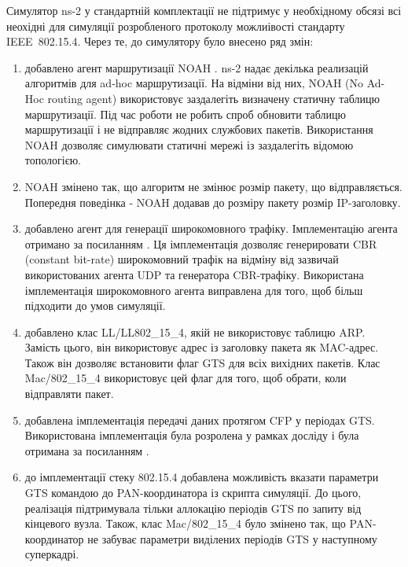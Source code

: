 \documentclass[a4paper,ukrainian,utf8,nocolumnsxix,floatsection,equationsection]{eskdtext}
\newcommand{\iee}[0]{IEEE~802.15.4\xspace}
\begin{document}
Симулятор ns-2 у стандартній комплектації не підтримує у необхідному обсязі всі неохідні для симуляції розробленого протоколу можлиівості стандарту \iee. Через те, до симулятору було внесено ряд змін:

\begin{enumerate}
	\item добавлено агент маршрутизації NOAH \cite{ns2:noah}. ns-2 надає декілька реализацій алгоритмів для ad-hoc маршрутизації. На відміни від них, NOAH (No Ad-Hoc routing agent) використовує заздалегіть визначену статичну таблицю маршрутизації. Під час роботи не робить спроб обновити таблицю маршрутизації і не відправляє жодних службових пакетів. Використання NOAH дозволяє симулювати статичні мережі із заздалегіть відомою топологією.

	\item NOAH змінено так, що алгоритм не змінює розмір пакету, що відправляється. Попередня поведінка - NOAH додавав до розміру пакету розмір IP-заголовку. 

	\item добавлено агент для генерації широкомовного трафіку. Імплементацію агента отримано за посиланням \cite{ns2:broadcastapp}. Ця імплементація дозволяє генерировати CBR (constant bit-rate) широкомовний трафік на відміну від зазвичай використованих агента UDP та генератора CBR-трафіку. Використана імплементація широкомовного агента виправлена для того, щоб більш підходити до умов симуляції.
	

	\item добавлено клас LL/LL802\_15\_4, якій не використовує таблицю ARP. Замість цього, він використовує адрес із заголовку пакета як MAC-адрес. Також він дозволяє встановити флаг GTS для всіх вихідних пакетів. Клас Mac/802\_15\_4 використовує цей флаг для того, щоб обрати, коли відправляти пакет. 

	\item добавлена імплементація передачі даних протягом CFP у періодах GTS. Використована імплементація була розролена у рамках досліду \cite{ns2:with:cfp} і була отримана за посиланням \cite{ns2:with:cfp:sources}.

	\item до імплементації стеку 802.15.4 добавлена можливість вказати параметри GTS командою до PAN-координатора із скрипта симуляції. До цього, реалізація підтримувала тільки аллокацію періодів GTS по запиту від кінцевого вузла. Також, клас Mac/802\_15\_4 було змінено так, що PAN-координатор не забуває параметри виділених періодів GTS у наступному суперкадрі.


\end{enumerate}
\end{document}
